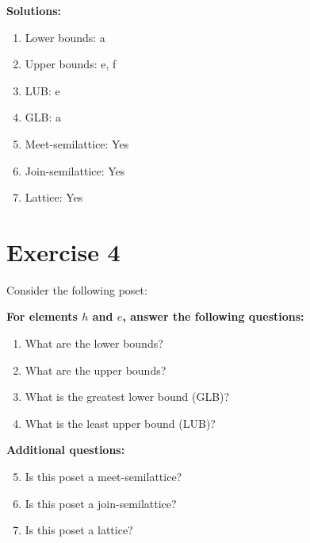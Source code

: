 \documentclass{article}
\begin{document}
\textbf{Solutions:}
\begin{enumerate}
    \item Lower bounds: {a}
    \item Upper bounds: {e, f}
    \item LUB: e
    \item GLB: a
    \item Meet-semilattice: Yes
    \item Join-semilattice: Yes
    \item Lattice: Yes
\end{enumerate}
\newpage
\section*{Exercise 4}
Consider the following poset:
\begin{center}
\end{center}

    \textbf{For elements $h$ and $e$, answer the following questions:}
\begin{enumerate}
    \item What are the lower bounds?
    \item What are the upper bounds?
    \item What is the greatest lower bound (GLB)?
    \item What is the least upper bound (LUB)?
\end{enumerate}
    \hspace*{3ex} \textbf{Additional questions:}
\begin{enumerate}
    \setcounter{enumi}{4}
    \item Is this poset a meet-semilattice?
    \item Is this poset a join-semilattice?
    \item Is this poset a lattice?
\end{enumerate}
\end{document}
